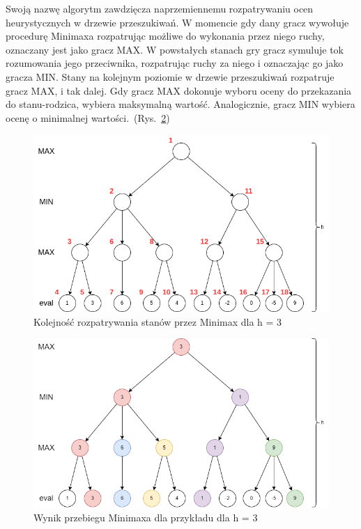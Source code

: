 \vspace{1cm}

Swoją nazwę algorytm zawdzięcza naprzemiennemu rozpatrywaniu ocen heurystycznych w drzewie przeszukiwań. W momencie gdy dany gracz wywołuje procedurę Minimaxa rozpatrując możliwe do wykonania przez niego ruchy, oznaczany jest jako gracz MAX. W powstałych stanach gry gracz symuluje tok rozumowania jego przeciwnika, rozpatrując ruchy za niego i oznaczając go jako gracza MIN. Stany na kolejnym poziomie w drzewie przeszukiwań rozpatruje gracz MAX, i tak dalej. Gdy gracz MAX dokonuje wyboru oceny do przekazania do stanu-rodzica, wybiera maksymalną wartość. Analogicznie, gracz MIN wybiera ocenę o minimalnej wartości.~(Rys.~\ref{fig:minimax})

\begin{figure}
    \centering
    \includegraphics[scale=.6]{graphics/minimax_kolejnosc.png}
    \caption{Kolejność rozpatrywania stanów przez Minimax dla h = 3}
    \label{fig:kolejnosc}
\end{figure}

\begin{figure}
    \centering
    \includegraphics[scale=.6]{graphics/minimax_przebieg.png}
    \caption{Wynik przebiegu Minimaxa dla przykładu dla h = 3}
    \label{fig:minimax}
\end{figure}

